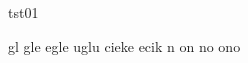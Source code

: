 \documentclass[a4paper, wide, 12pt]{mwart}
\begin{document}
\huge tst01

{\fonta gl gle egle uglu
cieke ecik
n on no ono }
\end{document}
